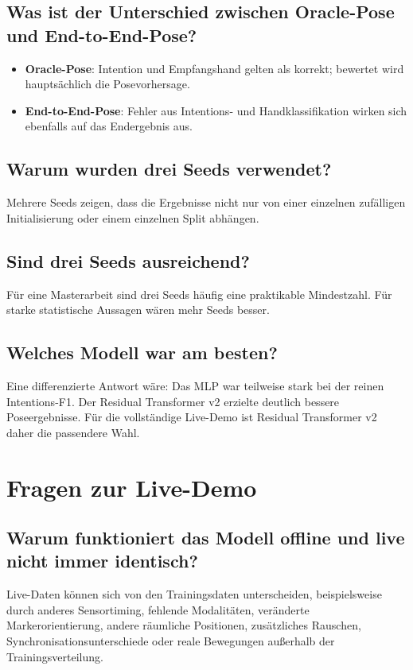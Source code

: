 \documentclass[11pt,a4paper]{article}
\begin{document}
\subsection*{Was ist der Unterschied zwischen Oracle-Pose und End-to-End-Pose?}
\begin{itemize}
    \item \textbf{Oracle-Pose}: Intention und Empfangshand gelten als korrekt; bewertet wird hauptsächlich die Posevorhersage.
    \item \textbf{End-to-End-Pose}: Fehler aus Intentions- und Handklassifikation wirken sich ebenfalls auf das Endergebnis aus.
\end{itemize}

\subsection*{Warum wurden drei Seeds verwendet?}
Mehrere Seeds zeigen, dass die Ergebnisse nicht nur von einer einzelnen zufälligen Initialisierung oder einem einzelnen Split abhängen.

\subsection*{Sind drei Seeds ausreichend?}
Für eine Masterarbeit sind drei Seeds häufig eine praktikable Mindestzahl. Für starke statistische Aussagen wären mehr Seeds besser.

\subsection*{Welches Modell war am besten?}
Eine differenzierte Antwort wäre: Das MLP war teilweise stark bei der reinen Intentions-F1. Der Residual Transformer v2 erzielte deutlich bessere Poseergebnisse. Für die vollständige Live-Demo ist Residual Transformer v2 daher die passendere Wahl.

\section{Fragen zur Live-Demo}

\subsection*{Warum funktioniert das Modell offline und live nicht immer identisch?}
Live-Daten können sich von den Trainingsdaten unterscheiden, beispielsweise durch anderes Sensortiming, fehlende Modalitäten, veränderte Markerorientierung, andere räumliche Positionen, zusätzliches Rauschen, Synchronisationsunterschiede oder reale Bewegungen außerhalb der Trainingsverteilung.
\end{document}
